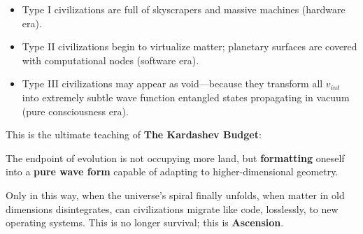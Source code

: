 \begin{itemize}
\item Type I civilizations are full of skyscrapers and massive machines (hardware era).

\item Type II civilizations begin to virtualize matter; planetary surfaces are covered with computational nodes (software era).

\item Type III civilizations may appear as void---because they transform all $v_{int}$ into extremely subtle wave function entangled states propagating in vacuum (pure consciousness era).
\end{itemize}

This is the ultimate teaching of \textbf{The Kardashev Budget}:

The endpoint of evolution is not occupying more land, but \textbf{formatting} oneself into a \textbf{pure wave form} capable of adapting to higher-dimensional geometry.

Only in this way, when the universe's spiral finally unfolds, when matter in old dimensions disintegrates, can civilizations migrate like code, losslessly, to new operating systems. This is no longer survival; this is \textbf{Ascension}.

